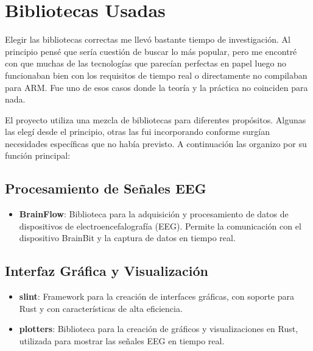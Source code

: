\newpage

\section{Bibliotecas Usadas}

Elegir las bibliotecas correctas me llevó bastante tiempo de investigación. Al principio pensé que sería cuestión de buscar lo más popular, pero me encontré con que muchas de las tecnologías que parecían perfectas en papel luego no funcionaban bien con los requisitos de tiempo real o directamente no compilaban para ARM. Fue uno de esos casos donde la teoría y la práctica no coinciden para nada.

El proyecto utiliza una mezcla de bibliotecas para diferentes propósitos. Algunas las elegí desde el principio, otras las fui incorporando conforme surgían necesidades específicas que no había previsto. A continuación las organizo por su función principal:

\subsection{Procesamiento de Señales EEG}
\begin{itemize}
    \item \textbf{BrainFlow}: Biblioteca para la adquisición y procesamiento de datos de dispositivos de electroencefalografía (EEG). Permite la comunicación con el dispositivo BrainBit y la captura de datos en tiempo real.
\end{itemize}

\subsection{Interfaz Gráfica y Visualización}
\begin{itemize}
    \item \textbf{slint}: Framework para la creación de interfaces gráficas, con soporte para Rust y con características de alta eficiencia.
    \item \textbf{plotters}: Biblioteca para la creación de gráficos y visualizaciones en Rust, utilizada para mostrar las señales EEG en tiempo real.
\end{itemize}

